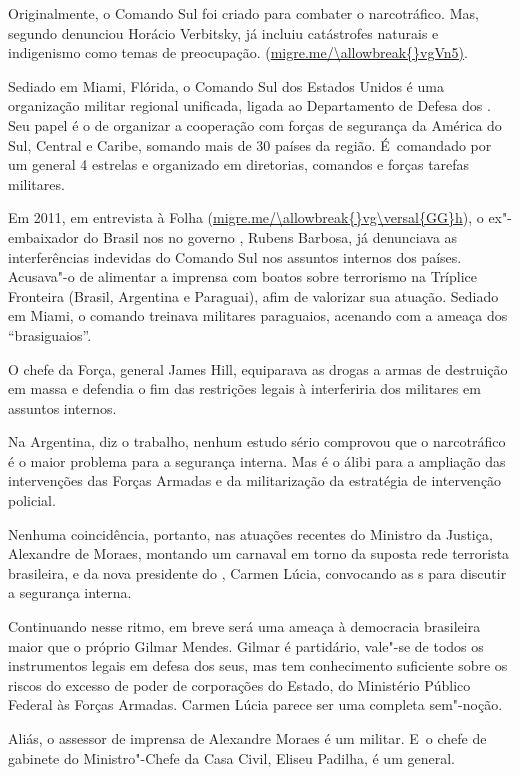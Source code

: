 Originalmente, o Comando Sul foi criado para combater o narcotráfico.
Mas, segundo denunciou Horácio Verbitsky, já incluiu catástrofes
naturais e indigenismo como temas de preocupação.
(\url{migre.me/\allowbreak{}vgVn5)}.

Sediado em Miami, Flórida, o Comando Sul dos Estados Unidos é uma
organização militar regional unificada, ligada ao Departamento de Defesa
dos . Seu papel é o de organizar a cooperação com forças de segurança
da América do Sul, Central e Caribe, somando mais de 30 países da
região. É~comandado por um general 4 estrelas e organizado em
diretorias, comandos e forças tarefas militares.

Em 2011, em entrevista à Folha (\url{migre.me/\allowbreak{}vg\versal{GG}h}), o
ex"-embaixador do Brasil nos  no governo , Rubens Barbosa, já
denunciava as interferências indevidas do Comando Sul nos assuntos
internos dos países. Acusava"-o de alimentar a imprensa com boatos sobre
terrorismo na Tríplice Fronteira (Brasil, Argentina e Paraguai), afim de
valorizar sua atuação. Sediado em Miami, o comando treinava militares
paraguaios, acenando com a ameaça dos ``brasiguaios''.

O chefe da Força, general James Hill, equiparava as drogas a armas de
destruição em massa e defendia o fim das restrições legais à
interferiria dos militares em assuntos internos.

Na Argentina, diz o trabalho, nenhum estudo sério comprovou que o
narcotráfico é o maior problema para a segurança interna. Mas é o álibi
para a ampliação das intervenções das Forças Armadas e da militarização
da estratégia de intervenção policial.

Nenhuma coincidência, portanto, nas atuações recentes do Ministro da
Justiça, Alexandre de Moraes, montando um carnaval em torno da suposta
rede terrorista brasileira, e da nova presidente do , Carmen Lúcia,
convocando as s para discutir a segurança interna.

Continuando nesse ritmo, em breve será uma ameaça à democracia
brasileira maior que o próprio Gilmar Mendes. Gilmar é partidário,
vale"-se de todos os instrumentos legais em defesa dos seus, mas tem
conhecimento suficiente sobre os riscos do excesso de poder de
corporações do Estado, do Ministério Público Federal às Forças Armadas.
Carmen Lúcia parece ser uma completa sem"-noção.

Aliás, o assessor de imprensa de Alexandre Moraes é um militar. E~o
chefe de gabinete do Ministro"-Chefe da Casa Civil, Eliseu Padilha, é um
general.


